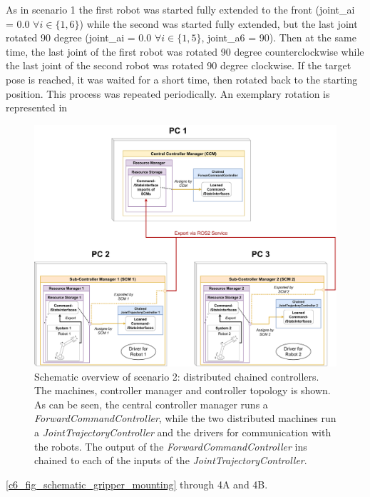 As in scenario 1 the first robot was started fully extended to the front (joint\_ai = 0.0 $\forall i\in\{1,6\}$) while the second was started fully extended, but the last joint rotated 90 degree (joint\_ai = 0.0 $\forall i\in\{1,5\}$, joint\_a6 = 90). Then at the same time, the last joint of the first robot was rotated 90 degree counterclockwise while the last joint of the second robot was rotated 90 degree clockwise. If the target pose is reached, it was waited for a short time, then rotated back to the starting position. This process was repeated periodically. An exemplary rotation is represented in 
\begin{figure}[htbp]
	\centering
	\includegraphics[width=1\textwidth]{Figures/c6/test_scenario_2.pdf}
	\caption{Schematic overview of scenario 2: distributed chained controllers. The machines, controller manager and controller topology is shown. As can be seen, the central controller manager runs a \textit{ForwardCommandController}, while the two distributed machines run a \textit{JointTrajectoryController} and the drivers for communication with the robots. The output of the \textit{ForwardCommandController} ins chained to each of the inputs of the \textit{JointTrajectoryController}.}
	\label{c6_fig_test_scenario_2}
\end{figure}
\autoref{c6_fig_schematic_gripper_mounting} through 4A and 4B.\newline
